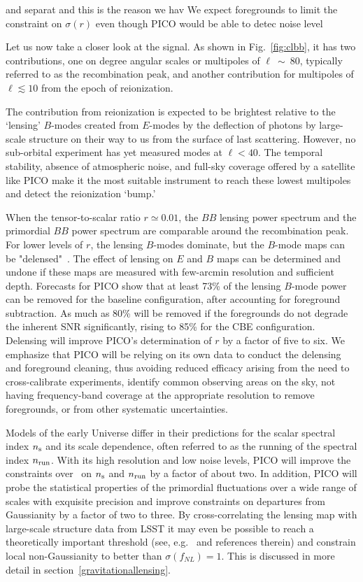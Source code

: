 \documentclass[PICOReport.tex]{subfiles}
\begin{document}
and separat and this is the reason we hav We expect foregrounds to limit the constraint on $\sigma(r)$ even though PICO would be able to detec noise level 

Let us now take a closer look at the signal. As shown in Fig.~\ref{fig:clbb}, it has two contributions, one on degree angular scales or multipoles of $\ell~\sim~80$, typically referred to as the recombination peak, and another contribution for multipoles of $\ell\lesssim 10$ from the epoch of reionization. 

The contribution from reionization is expected to be brightest relative to the `lensing' $B$-modes created from $E$-modes by the deflection of photons by large-scale structure on their way to us from the surface of last scattering. However, no sub-orbital experiment has yet measured modes at $\ell<40$. The temporal stability, absence of atmospheric noise, and full-sky coverage offered by a satellite like PICO make it the most suitable instrument to reach these lowest multipoles and detect the reionization `bump.'


When the tensor-to-scalar ratio $r \simeq 0.01$, the $BB$ lensing power spectrum and the primordial $BB$ power spectrum are comparable around the recombination peak. For lower levels of $r$, the lensing $B$-modes dominate, but the $B$-mode maps can be "delensed"~\citep{2004PhRvD..69d3005S,2012JCAP...06..014S}. The effect of lensing on $E$ and $B$ maps can be determined and undone if these maps are measured with few-arcmin resolution and sufficient depth. Forecasts for PICO show that at least 73\% of the lensing $B$-mode power can be removed for the baseline configuration, after accounting for foreground subtraction. As much as 80\% will be removed if the foregrounds do not degrade the inherent \ac{SNR} significantly, rising to 85\% for the CBE configuration. Delensing will improve PICO's determination of $r$ by a factor of five to six. We emphasize that PICO will be relying on its own data to conduct the delensing and foreground cleaning, thus avoiding reduced efficacy arising from the need to cross-calibrate experiments, identify common observing areas on the sky, not having frequency-band coverage at the appropriate resolution to remove foregrounds, or from other systematic uncertainties.



Models of the early Universe  differ in their predictions for the scalar spectral index $n_{\rm s}$ and its scale dependence, often referred to as the running of the spectral index $n_{\rm run}$. With its high resolution and low noise levels, PICO will improve the constraints over \planck~on $n_{\rm s}$ and $n_{\rm run}$ by a factor of about two. In addition, PICO will probe the statistical properties of the primordial fluctuations over a wide range of scales with exquisite precision and improve constraints on departures from Gaussianity by a factor of two to three. By cross-correlating the lensing map with large-scale structure data from LSST it may even be possible to reach a theoretically important threshold (see, e.g.~\cite{2014arXiv1412.4671A} and references therein) and constrain local non-Gaussianity to better than $\sigma(f_{NL})=1$. This is discussed in more detail in section~\ref{gravitationallensing}.
\end{document}
